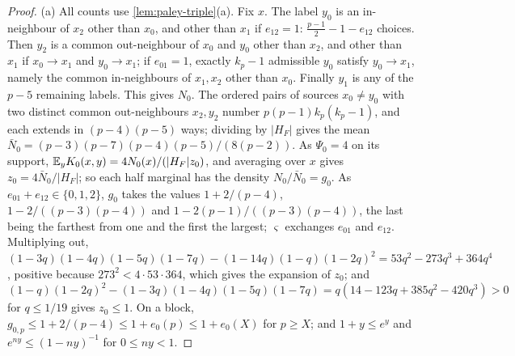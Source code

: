 \begin{proof}
(a) All counts use \cref{lem:paley-triple}(a). Fix $x$. The label $y_0$ is an
in-neighbour of $x_2$ other than $x_0$, and other than $x_1$ if $e_{12}=1$:
$\frac{p-1}2-1-e_{12}$ choices. Then $y_2$ is a common out-neighbour of $x_0$
and $y_0$ other than $x_2$, and other than $x_1$ if $x_0\to x_1$ and
$y_0\to x_1$; if $e_{01}=1$, exactly $k_p-1$ admissible $y_0$ satisfy
$y_0\to x_1$, namely the common in-neighbours of $x_1,x_2$ other than $x_0$.
Finally $y_1$ is any of the $p-5$ remaining labels. This gives $N_0$. The
ordered pairs of sources $x_0\ne y_0$ with two distinct common out-neighbours
$x_2,y_2$ number $p(p-1)k_p(k_p-1)$, and each extends in $(p-4)(p-5)$ ways;
dividing by $|H_F|$ gives the mean $\bar N_0=(p-3)(p-7)(p-4)(p-5)/(8(p-2))$. As
$\Psi_0=4$ on its support, $\mathbb E_yK_0(x,y)=4N_0(x)/(|H_F|z_0)$, and averaging
over $x$ gives $z_0=4\bar N_0/|H_F|$; so each half marginal has the density
$N_0/\bar N_0=g_0$. As $e_{01}+e_{12}\in\{0,1,2\}$, $g_0$ takes the values
$1+2/(p-4)$, $1-2/((p-3)(p-4))$ and $1-2(p-1)/((p-3)(p-4))$, the last being the
farthest from one and the first the largest; $\varsigma$ exchanges $e_{01}$
and $e_{12}$. Multiplying out,
$(1-3q)(1-4q)(1-5q)(1-7q)-(1-14q)(1-q)(1-2q)^2=53q^2-273q^3+364q^4$, positive
because $273^2<4\cdot53\cdot364$, which gives the expansion of $z_0$; and
$(1-q)(1-2q)^2-(1-3q)(1-4q)(1-5q)(1-7q)=q(14-123q+385q^2-420q^3)>0$ for
$q\le1/19$ gives $z_0\le1$. On a block, $g_{0,p}\le1+2/(p-4)\le1+e_0(p)\le
1+e_0(X)$ for $p\ge X$; and $1+y\le e^y$ and $e^{ny}\le(1-ny)^{-1}$ for
$0\le ny<1$.


\end{proof}
